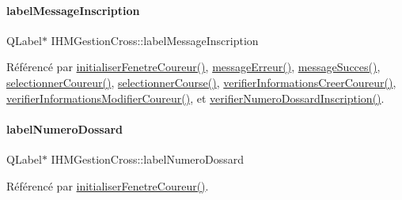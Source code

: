\paragraph{\texorpdfstring{label\+Message\+Inscription}{labelMessageInscription}}
{\footnotesize\ttfamily Q\+Label$\ast$ I\+H\+M\+Gestion\+Cross\+::label\+Message\+Inscription\hspace{0.3cm}{\ttfamily [private]}}



Référencé par \hyperlink{class_i_h_m_gestion_cross_aa5d9de499a66e52b843c4ef4c6074a60}{initialiser\+Fenetre\+Coureur()}, \hyperlink{class_i_h_m_gestion_cross_a92fa6016b00d2d4429c901e77d37bf10}{message\+Erreur()}, \hyperlink{class_i_h_m_gestion_cross_a71412d0c3e1d059a646c755803077a7b}{message\+Succes()}, \hyperlink{class_i_h_m_gestion_cross_ad71963d500fd61995fdae94e833db163}{selectionner\+Coureur()}, \hyperlink{class_i_h_m_gestion_cross_ae555b32462455a2cdaf0f8dc2e016d14}{selectionner\+Course()}, \hyperlink{class_i_h_m_gestion_cross_ae08eec25f5a6d33bf133b0cee78c7c5c}{verifier\+Informations\+Creer\+Coureur()}, \hyperlink{class_i_h_m_gestion_cross_a0e088653019d8adefb371348f272d2e2}{verifier\+Informations\+Modifier\+Coureur()}, et \hyperlink{class_i_h_m_gestion_cross_a164be2d046cf18ee03e3939d03a5580d}{verifier\+Numero\+Dossard\+Inscription()}.

\mbox{\label{class_i_h_m_gestion_cross_a3209e0dfc51bb3a17e2ef700a778178b}} 
\paragraph{\texorpdfstring{label\+Numero\+Dossard}{labelNumeroDossard}}
{\footnotesize\ttfamily Q\+Label$\ast$ I\+H\+M\+Gestion\+Cross\+::label\+Numero\+Dossard\hspace{0.3cm}{\ttfamily [private]}}



Référencé par \hyperlink{class_i_h_m_gestion_cross_aa5d9de499a66e52b843c4ef4c6074a60}{initialiser\+Fenetre\+Coureur()}.

\mbox{\label{class_i_h_m_gestion_cross_ab6c32fd079f81c4fa0b9ec0b4ef9bb61}} 
